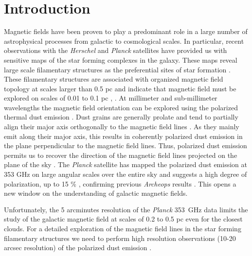 \documentclass[twocolumn, traditabstract]{aa}
\begin{document}
\section{Introduction}\label{sec:introduction}
Magnetic fields have been proven to play a predominant role in a large number of
astrophysical processes from galactic to cosmological scales. In particular,
recent observations with the {\it Herschel} and {\it Planck} \citep{planck2013mission}
satellites have provided us with sensitive maps of the star forming
complexes in the galaxy. These maps reveal large scale filamentary structures as
the preferential sites of star formation
\citep{2010A&A...518L.100M,arzoumianian}. These filamentary structures
are associated with organized magnetic field topology at scales larger than 0.5 pc
\citep{2014prpl.conf...27A} and indicate that magnetic field must be explored on scales of
0.01 to 0.1 pc \citep{2004ApJ...603..584P}, \citep{planckXXXIII}.
At millimeter and sub-millimeter wavelengths the magnetic field orientation can
be explored using the polarized thermal dust emission
\citep{2015A&A...576A.104P,2016arXiv160100546P}. Dust grains are generally
prolate and tend to partially align their major axis orthogonally to the
magnetic field lines \citep{1951ApJ...114..206D, 1988QJRAS..29..327H}. As they
mainly emit along their major axis, this results in coherently
polarized dust emission in the plane perpendicular to the magnetic field
lines. Thus, polarized dust emission permits us to recover the direction of the
magnetic field lines projected on the plane of the sky
\citep[{\it e.g.}][]{2015A&A...576A.106P}. The {\it Planck} satellite has mapped the polarized
dust emission at 353 GHz on large angular scales over the entire sky
\citep{2014A&A...571A...8P,2015arXiv150201587P} and suggests a high degree
of polarization, up to 15 \% \citep{planckdust}, confirming previous {\it Archeops}
results \citep{2004A&A...424..571B}. This opens a new window on the
understanding of galactic magnetic fields.

Unfortunately, the 5 arcminutes resolution of the {\it Planck} 353~GHz data limits the study of the galactic magnetic field at scales
of 0.2 to 0.5 pc even for the closest clouds. For a detailed exploration of the
magnetic field lines in the star forming filamentary structures we need to perform high resolution observations (10-20 arcsec
resolution) of the polarized dust emission \citep{2014ApJ...792..116Z}.
\end{document}
